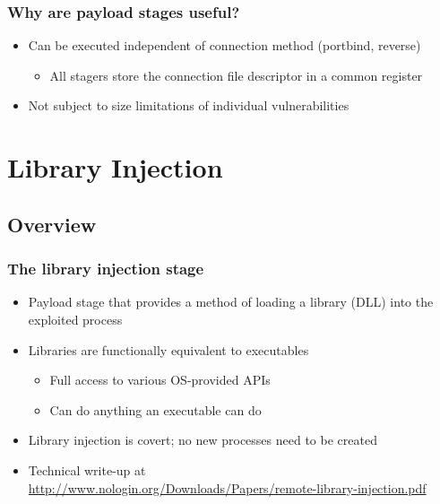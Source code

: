 \documentclass{beamer}
\newenvironment{sitemize}{\vspace{1mm}\begin{itemize}\itemsep 4pt\small}{\end{itemize}}
\begin{document}
\begin{frame}[t]
    \frametitle{Why are payload stages useful?}

    \begin{sitemize}
        \item Can be executed independent of connection method
        (portbind, reverse)
        \begin{sitemize}
            \item All stagers store the connection file descriptor
            in a common register
        \end{sitemize}

        \pause
        \item Not subject to size limitations of individual
        vulnerabilities
    \end{sitemize}
\end{frame}

\section{Library Injection}

\subsection{Overview}

\begin{frame}[t]
    \frametitle{The library injection stage}

    \begin{sitemize}
        \item Payload stage that provides a method of loading a
        library (DLL) into the exploited process

        \pause
        \item Libraries are functionally equivalent to executables
        \begin{sitemize}
            \item Full access to various OS-provided APIs
            \item Can do anything an executable can do
        \end{sitemize}

        \pause
        \item Library injection is covert; no new processes
        need to be created

        \pause
        \item Technical write-up at \\
        \footnotesize{\url{http://www.nologin.org/Downloads/Papers/remote-library-injection.pdf}}

    \end{sitemize}
\end{frame}
\end{document}
